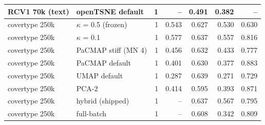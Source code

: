 \begin{tabular}{llrrrrr}
RCV1 70k (text) & openTSNE default & 1 & -- & 0.491 & 0.382 & -- \\
\midrule
covertype 250k & \magnet{} $\kappa$ = 0.5 (frozen) & 1 & 0.543 & 0.627 & 0.530 & 0.630 \\
covertype 250k & \magnet{} $\kappa$ = 0.1 & 1 & 0.577 & 0.637 & 0.557 & 0.816 \\
covertype 250k & PaCMAP stiff (MN 4) & 1 & 0.456 & 0.632 & 0.433 & 0.777 \\
covertype 250k & PaCMAP default & 1 & 0.401 & 0.630 & 0.377 & 0.883 \\
covertype 250k & UMAP default & 1 & 0.287 & 0.639 & 0.271 & 0.729 \\
covertype 250k & PCA-2 & 1 & 0.414 & 0.595 & 0.393 & 0.871 \\
covertype 250k & \magnet{} hybrid (shipped) & 1 & -- & 0.637 & 0.567 & 0.795 \\
covertype 250k & \magnet{} full-batch & 1 & -- & 0.608 & 0.342 & 0.809 \\
\bottomrule
\end{tabular}
